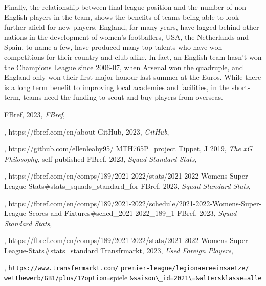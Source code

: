 \documentclass[12pt, a4paper, twocolumn]{article}
\begin{document}
Finally, the relationship between final league position and the number of non-English players in the team, shows the benefits of teams being able to look further afield for new players. England, for many years, have lagged behind other nations in the development of women's footballers, USA, the Netherlands and Spain, to name a few, have produced many top talents who have won competitions for their country and club alike. In fact, an English team hasn't won the Champions League since 2006-07, when Arsenal won the quadruple, and England only won their first major honour last summer at the Euros. While there is a long term benefit to improving local academies and facilities, in the short-term, teams need the funding to scout and buy players from overseas.


\begin{thebibliography}{10}
 FBref, 2023, \textit{FBref}, \date{January 7, 2023}, \textlangle https://fbref.com/en/about \textrangle
{} GitHub, 2023, \textit{GitHub}, \date{January 16 2023}, \textlangle https://github.com/ellenleahy95/
MTH765P\_project \textrangle
{} Tippet, J 2019, \textit{The xG Philosophy}, self-published
 FBref, 2023, \textit{Squad Standard Stats}, \date{December 11, 2022}, \textlangle  https://fbref.com/en/comps/189/2021-2022/stats/2021-2022-Womens-Super-League-Stats\#stats\_squads\_standard\_for \textrangle
{} FBref, 2023, \textit{Squad Standard Stats}, \date{December 11, 2022}, \textlangle  https://fbref.com/en/comps/189/2021-2022/schedule/2021-2022-Womens-Super-League-Scores-and-Fixtures\#sched\_2021-2022\_189\_1 \textrangle
{} FBref, 2023, \textit{Squad Standard Stats}, \date{December 11, 2022}, \textlangle  https://fbref.com/en/comps/189/2021-2022/stats/2021-2022-Womens-Super-League-Stats\#stats\_standard \textrangle
{} Transfrmarkt, 2023, \textit{Used Foreign Players}, \date{January 11, 2023}, \textlangle   \verb|https://www.transfermarkt.com/| \verb|premier-league/legionaereeinsaetze/| \verb|wettbewerb/GB1/plus/1?option=|spiele \verb|&saison\_id=2021\=&altersklasse=alle| \textrangle
\end{thebibliography}
\end{document}
